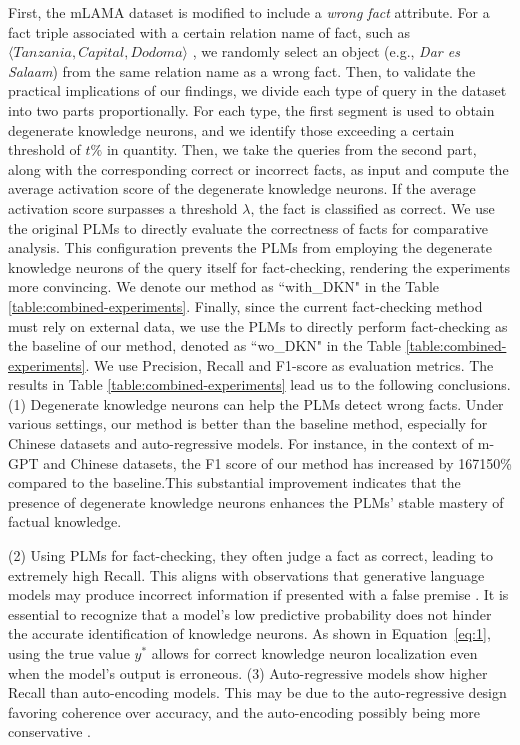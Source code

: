\documentclass[]{article}
\begin{document}
First, the mLAMA dataset is modified to include a \textit{wrong fact} attribute.
For a fact triple associated with a certain relation name of fact, such as $\langle \textit{Tanzania}, \textit{Capital}, \textit{Dodoma} \rangle$ , we randomly select an object (e.g., \textit{Dar es Salaam}) from the same relation name as a wrong fact.
Then, to validate the practical implications of our findings, we divide each type of query in the dataset into two parts proportionally. For each type, the first segment is used to obtain degenerate knowledge neurons, and we identify those exceeding a certain threshold of \( t\% \) in quantity.
Then, we take the queries from the second part, along with the corresponding correct or incorrect facts, as input and compute the average activation score of the degenerate knowledge neurons. If the average activation score surpasses a threshold $\lambda$, the fact is classified as correct.
We use the original PLMs to directly evaluate the correctness of facts for comparative analysis. This configuration prevents the PLMs from employing the degenerate knowledge neurons of the query itself for fact-checking, rendering the experiments more convincing. We denote our method as ``with\_DKN" in the Table \ref{table:combined-experiments}.
Finally, since the current fact-checking method must rely on external data, we use the PLMs to directly perform fact-checking as the baseline of our method, denoted as ``wo\_DKN" in the Table \ref{table:combined-experiments}. We use Precision, Recall and F1-score as evaluation metrics.  The results in Table \ref{table:combined-experiments} lead us to the following conclusions.  (1) Degenerate knowledge neurons can help the PLMs detect wrong facts. Under various settings, our method is better than the baseline method, especially for Chinese datasets and auto-regressive models. For instance, in the context of m-GPT and Chinese datasets, the F1 score of our method has increased by 167150\% compared to the baseline.This substantial improvement indicates that the presence of degenerate knowledge neurons enhances the PLMs' stable mastery of factual knowledge.

(2) Using PLMs for fact-checking, they often judge a fact as correct, leading to extremely high Recall. This aligns with observations that generative language models may produce incorrect information if presented with a false premise \cite{hallucination_chatgpt3, lakshmanan2022large, metz2022new}.
It is essential to recognize that a model's low predictive probability does not hinder the accurate identification of knowledge neurons. As shown in Equation~\ref{eq:1}, using the true value \( y^* \) allows for correct knowledge neuron localization even when the model's output is erroneous.  (3) Auto-regressive models show higher Recall than auto-encoding models. This may be due to the auto-regressive design favoring coherence over accuracy, and the auto-encoding possibly being more conservative  \cite{zhou2023comprehensive}.
\end{document}

